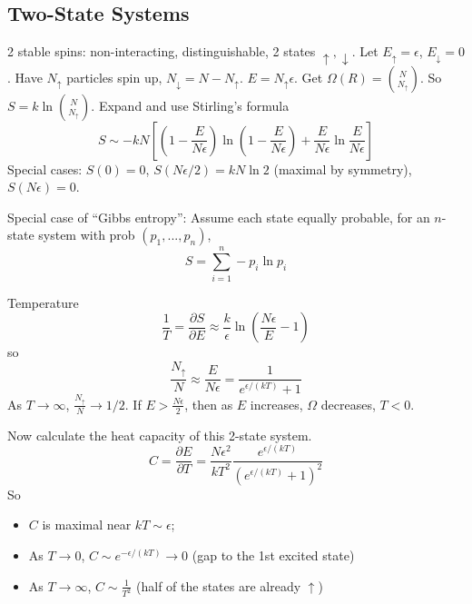 \documentclass{article}
\theoremstyle{definition}
\theoremstyle{remark}
\theoremstyle{plain}
\begin{document}
\subsection{Two-State Systems}
2 stable spins: non-interacting, distinguishable, 2 states $\uparrow,\downarrow$. Let $E_\uparrow=\epsilon$, $E_\downarrow=0$. Have $N_\uparrow$ particles spin up, $N_\downarrow=N-N_\uparrow$. $E=N_\uparrow\epsilon$. Get $\Omega(R)=\binom{N}{N_\uparrow}$. So $S=k\ln \binom{N}{N_\uparrow}$. Expand and use Stirling's formula
\[S\sim -kN\left[\left(1-\dfrac{E}{N\epsilon}\right)\ln\left(1-\dfrac{E}{N\epsilon}\right)+\dfrac{E}{N\epsilon}\ln\dfrac{E}{N\epsilon}\right]\]
Special cases: $S(0)=0$, $S(N\epsilon/2)=kN\ln 2$ (maximal by symmetry), $S(N\epsilon)=0$.

Special case of ``Gibbs entropy'': Assume each state equally probable, for an $n$-state system with prob $(p_1,...,p_n)$,
\[S=\sum_{i=1}^n-p_i\ln p_i\]

Temperature 
\[\dfrac{1}{T}=\dfrac{\partial S}{\partial E}\approx \dfrac{k}{\epsilon}\ln\left(\dfrac{N\epsilon}{E}-1\right)\]
so
\[\dfrac{N_\uparrow}{N}\approx\dfrac{E}{N\epsilon}=\dfrac{1}{e^{\epsilon/(kT)}+1}\]
As $T\to\infty$, $\frac{N_\uparrow}{N}\to 1/2$. If $E>\frac{N\epsilon}{2}$, then as $E$ increases, $\Omega$ decreases, $T<0$.

Now calculate the heat capacity of this 2-state system.
\[C=\dfrac{\partial E}{\partial T}=\dfrac{N\epsilon^2}{kT^2}\dfrac{e^{\epsilon/(kT)}}{(e^{\epsilon/(kT)}+1)^2}\]
So
\begin{itemize}
    \item $C$ is maximal near $kT\sim\epsilon$;
    \item As $T\to 0$, $C\sim e^{-\epsilon/(kT)}\to 0$ (gap to the 1st excited state)
    \item As $T\to \infty$, $C\sim \frac{1}{T^2}$ (half of the states are already $\uparrow$)
\end{itemize}
\end{document}
